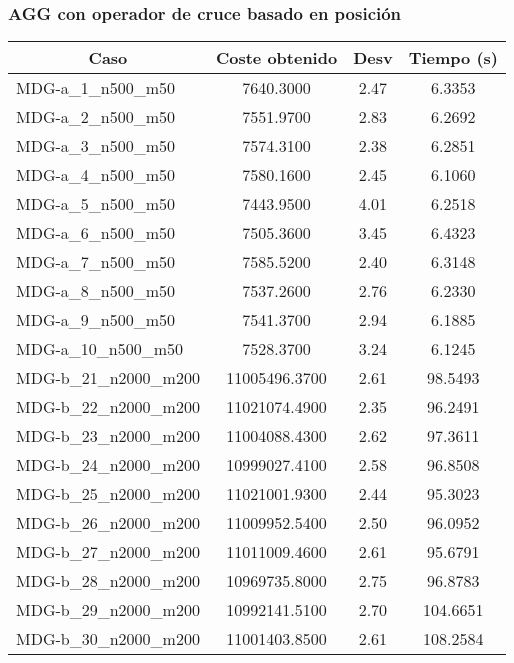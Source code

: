 \documentclass[10pt,a4paper]{article}
\begin{document}
\subsubsection{AGG con operador de cruce basado en posición}
\begin{table}[H]
		\begin{center}
		\begin{tabular}{|l|c|c|c|} 
			\hline
			\multicolumn{1}{|c|}{\textbf{Caso}} & \textbf{Coste obtenido} & \textbf{Desv} & \textbf{Tiempo (s)} \\ \hline
		MDG-a\_1\_n500\_m50 & 7640.3000 & 2.47 & 6.3353 \\ \hline
		MDG-a\_2\_n500\_m50 & 7551.9700 & 2.83 & 6.2692 \\ \hline
		MDG-a\_3\_n500\_m50 & 7574.3100 & 2.38 & 6.2851 \\ \hline
		MDG-a\_4\_n500\_m50 & 7580.1600 & 2.45 & 6.1060 \\ \hline
		MDG-a\_5\_n500\_m50 & 7443.9500 & 4.01 & 6.2518 \\ \hline
		MDG-a\_6\_n500\_m50 & 7505.3600 & 3.45 & 6.4323 \\ \hline
		MDG-a\_7\_n500\_m50 & 7585.5200 & 2.40 & 6.3148 \\ \hline
		MDG-a\_8\_n500\_m50 & 7537.2600 & 2.76 & 6.2330 \\ \hline
		MDG-a\_9\_n500\_m50 & 7541.3700 & 2.94 & 6.1885 \\ \hline
		MDG-a\_10\_n500\_m50 & 7528.3700 & 3.24 & 6.1245 \\ \hline
		MDG-b\_21\_n2000\_m200 & 11005496.3700 & 2.61 & 98.5493 \\ \hline
		MDG-b\_22\_n2000\_m200 & 11021074.4900 & 2.35 & 96.2491 \\ \hline
		MDG-b\_23\_n2000\_m200 & 11004088.4300 & 2.62 & 97.3611 \\ \hline
		MDG-b\_24\_n2000\_m200 & 10999027.4100 & 2.58 & 96.8508 \\ \hline
		MDG-b\_25\_n2000\_m200 & 11021001.9300 & 2.44 & 95.3023 \\ \hline
		MDG-b\_26\_n2000\_m200 & 11009952.5400 & 2.50 & 96.0952 \\ \hline
		MDG-b\_27\_n2000\_m200 & 11011009.4600 & 2.61 & 95.6791 \\ \hline
		MDG-b\_28\_n2000\_m200 & 10969735.8000 & 2.75 & 96.8783 \\ \hline
		MDG-b\_29\_n2000\_m200 & 10992141.5100 & 2.70 & 104.6651 \\ \hline
		MDG-b\_30\_n2000\_m200 & 11001403.8500 & 2.61 & 108.2584 \\ \hline

\end{tabular}
\end{center}
\end{table}
\end{document}
